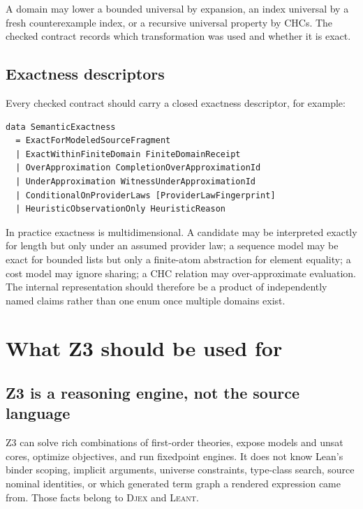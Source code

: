 \documentclass[11pt,oneside]{report}
\newcommand{\Leant}{\textsc{Leant}\xspace}
\newcommand{\Djex}{\textsc{Djex}\xspace}
\begin{document}
A domain may lower a bounded universal by expansion, an index universal by a fresh counterexample index, or a recursive universal property by CHCs. The checked contract records which transformation was used and whether it is exact.

\section{Exactness descriptors}

Every checked contract should carry a closed exactness descriptor, for example:

\begin{lstlisting}[language=HaskellX,caption={Illustrative exactness vocabulary.},label={lst:exactness}]
data SemanticExactness
  = ExactForModeledSourceFragment
  | ExactWithinFiniteDomain FiniteDomainReceipt
  | OverApproximation CompletionOverApproximationId
  | UnderApproximation WitnessUnderApproximationId
  | ConditionalOnProviderLaws [ProviderLawFingerprint]
  | HeuristicObservationOnly HeuristicReason
\end{lstlisting}

In practice exactness is multidimensional. A candidate may be interpreted exactly for length but only under an assumed provider law; a sequence model may be exact for bounded lists but only a finite-atom abstraction for element equality; a cost model may ignore sharing; a CHC relation may over-approximate evaluation. The internal representation should therefore be a product of independently named claims rather than one enum once multiple domains exist.

\chapter{What Z3 should be used for}
\label{chap:z3-capabilities}

\section{Z3 is a reasoning engine, not the source language}

Z3 can solve rich combinations of first-order theories, expose models and unsat cores, optimize objectives, and run fixedpoint engines. It does not know Lean's binder scoping, implicit arguments, universe constraints, type-class search, source nominal identities, or which generated term graph a rendered expression came from. Those facts belong to \Djex and \Leant.
\end{document}
